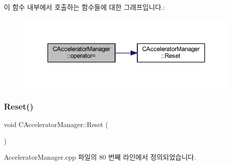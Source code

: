 이 함수 내부에서 호출하는 함수들에 대한 그래프입니다.\+:
\nopagebreak
\begin{figure}[H]
\begin{center}
\leavevmode
\includegraphics[width=336pt]{class_c_accelerator_manager_a11c56cbcdfac0008ecb4aef10ba51ae8_cgraph}
\end{center}
\end{figure}
\mbox{\label{class_c_accelerator_manager_aca456cda1a5f9b17bcfaea4f8ff45903}} 
\subsubsection{\texorpdfstring{Reset()}{Reset()}}
{\footnotesize\ttfamily void C\+Accelerator\+Manager\+::\+Reset (\begin{DoxyParamCaption}{ }\end{DoxyParamCaption})\hspace{0.3cm}{\ttfamily [protected]}}



Accelerator\+Manager.\+cpp 파일의 80 번째 라인에서 정의되었습니다.


